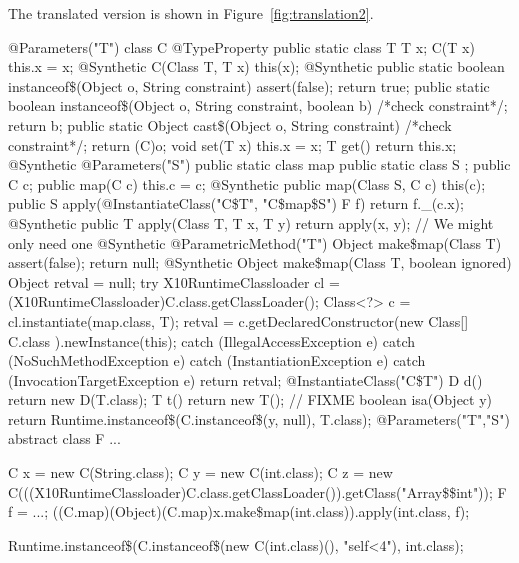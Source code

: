 The translated version is shown in Figure~\ref{fig:translation2}.
\begin{figure*}[tp]
{\footnotesize
\begin{xten}
@Parameters({"T"})
class C {
    @TypeProperty public static class T { }
    T x;
    C(T x) { this.x = x; }
    @Synthetic C(Class T, T x) { this(x); }
    @Synthetic public static boolean instanceof\$(Object o, String constraint) { assert(false); return true; }
    public static boolean instanceof\$(Object o, String constraint, boolean b) { /*check constraint*/; return b; }
    public static Object cast\$(Object o, String constraint) { /*check constraint*/; return (C)o; }
    void set(T x) { this.x = x; }
    T get() { return this.x; }
    @Synthetic
    @Parameters("S")
    public static class map {
        public static class S { };
        public C c;
        public map(C c) { this.c = c; }
        @Synthetic
        public map(Class S, C c) { this(c); }
        public S apply(@InstantiateClass({"C\$T", "C\$map\$S"}) F f) { return f._(c.x); }
        @Synthetic
        public T apply(Class T, T x, T y) { return apply(x, y); } // We might only need one
    }
    @Synthetic
    @ParametricMethod("T")
    Object make\$map(Class T) { assert(false); return null; }
    @Synthetic
    Object make\$map(Class T, boolean ignored) {
        Object retval = null;
        try {
            X10RuntimeClassloader cl = (X10RuntimeClassloader)C.class.getClassLoader();
            Class<?> c = cl.instantiate(map.class, T); 
            retval = c.getDeclaredConstructor(new Class[] { C.class }).newInstance(this);
        }
        catch (IllegalAccessException e) { }
        catch (NoSuchMethodException e) { }
        catch (InstantiationException e) { }
        catch (InvocationTargetException e) { }
        return retval;
    }
    @InstantiateClass({"C\$T"}) D d() { return new D(T.class); }
    T t() { return new T(); } // FIXME
    boolean isa(Object y) { return Runtime.instanceof\$(C.instanceof\$(y, null), T.class); }
}
@Parameters({"T","S"})
abstract class F { ... }

C x = new C(String.class);
C y = new C(int.class);
C z = new C(((X10RuntimeClassloader)C.class.getClassLoader()).getClass("Array\$\$int"));
F f = ...;
((C.map)(Object)(C.map)x.make\$map(int.class)).apply(int.class, f);

Runtime.instanceof\$(C.instanceof\$(new C(int.class)(), "self<4"), int.class);
\end{xten}}
\caption{Translated code}
\label{fig:translation2}
\end{figure*}

